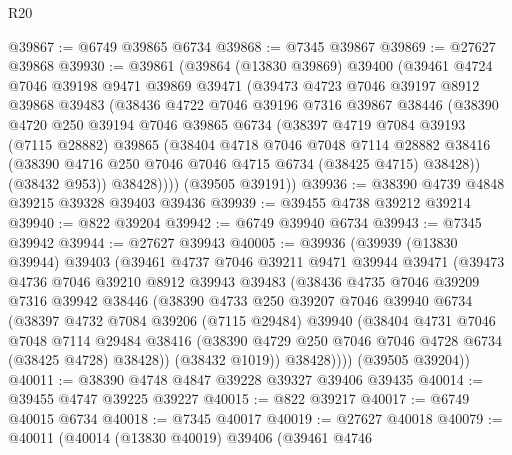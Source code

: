 \begin{lexlean}{R20}
\begin{coremodule}
{@39867 := @6749 @39865 @6734
@39868 := @7345 @39867
@39869 := @27627 @39868
@39930 := @39861
    (@39864
      (@13830 @39869)
      @39400
      (@39461
        @4724
        @7046
        @39198
        @9471
        @39869
        @39471
        (@39473
          @4723
          @7046
          @39197
          @8912
          @39868
          @39483
          (@38436
            @4722
            @7046
            @39196
            @7316
            @39867
            @38446
            (@38390
              @4720
              @250
              @39194
              @7046
              @39865
              @6734
              (@38397
                @4719
                @7084
                @39193
                (@7115 @28882)
                @39865
                (@38404
                  @4718
                  @7046
                  @7048
                  @7114
                  @28882
                  @38416
                  (@38390 @4716 @250 @7046 @7046 @4715 @6734 (@38425 @4715) @38428))
                (@38432 @953))
              @38428))))
      (@39505 @39191))
@39936 := @38390 @4739 @4848 @39215 @39328 @39403 @39436
@39939 := @39455 @4738 @39212 @39214
@39940 := @822 @39204
@39942 := @6749 @39940 @6734
@39943 := @7345 @39942
@39944 := @27627 @39943
@40005 := @39936
    (@39939
      (@13830 @39944)
      @39403
      (@39461
        @4737
        @7046
        @39211
        @9471
        @39944
        @39471
        (@39473
          @4736
          @7046
          @39210
          @8912
          @39943
          @39483
          (@38436
            @4735
            @7046
            @39209
            @7316
            @39942
            @38446
            (@38390
              @4733
              @250
              @39207
              @7046
              @39940
              @6734
              (@38397
                @4732
                @7084
                @39206
                (@7115 @29484)
                @39940
                (@38404
                  @4731
                  @7046
                  @7048
                  @7114
                  @29484
                  @38416
                  (@38390 @4729 @250 @7046 @7046 @4728 @6734 (@38425 @4728) @38428))
                (@38432 @1019))
              @38428))))
      (@39505 @39204))
@40011 := @38390 @4748 @4847 @39228 @39327 @39406 @39435
@40014 := @39455 @4747 @39225 @39227
@40015 := @822 @39217
@40017 := @6749 @40015 @6734
@40018 := @7345 @40017
@40019 := @27627 @40018
@40079 := @40011
    (@40014
      (@13830 @40019)
      @39406
      (@39461
        @4746
}
\end{coremodule}
\end{lexlean}
